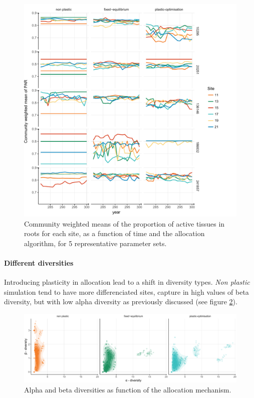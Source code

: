 

\begin{figure}%
    \includegraphics[width=1\linewidth]{./2_PP/Figures/Comm/comm_variability_lines.pdf}%
  \caption[Spatial and temporal variability of the CWMs of the PAR]{Community weighted means of the proportion of active tissues in roots for each site, as a function of time and the allocation algorithm, for 5 representative parameter sets.}
  \label{fg:comm_strat}
\end{figure}


\paragraph{Different diversities}

Introducing plasticity in allocation lead to a shift in diversity types. \textit{Non plastic} simulation tend to have more differenciated sites, capture in high values of beta diversity, but with low alpha diversity as previously discussed (see figure \ref{fig:diversities}). 

\begin{figure}\label{fig:diversities}
\includegraphics[]{./2_PP/Figures/Comm/comm_div_differences_alpha_beta.pdf}
\caption[Alpha and beta diversities as function of the allocation mechanism.]{Alpha and beta diversities as function of the allocation mechanism.}
\end{figure}

